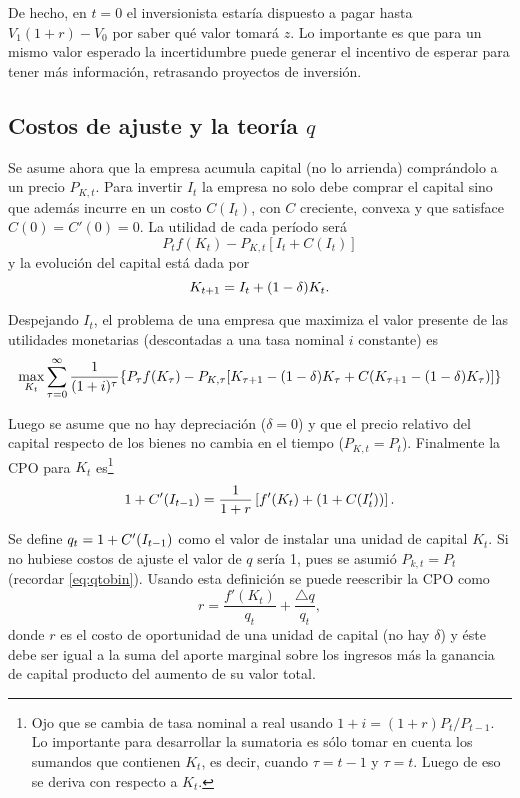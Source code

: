 \documentclass[DeGregorioResumen]{subfiles}
\begin{document}
De hecho, en $t=0$ el inversionista estaría dispuesto a pagar hasta $V_1(1+r)-V_0$ por saber qué valor tomará $z$. Lo importante es que para un mismo valor esperado la incertidumbre puede generar el incentivo de esperar para tener más información, retrasando proyectos de inversión.

\subsection{Costos de ajuste y la teoría $q$}

Se asume ahora que la empresa acumula capital (no lo arrienda) comprándolo a un precio $P_{K,t}$. Para invertir $I_t$ la empresa no solo debe comprar el capital sino que además incurre en un costo $C(I_t)$, con $C$ creciente, convexa y que satisface $C(0)=C'(0)=0$. La utilidad de cada período será
\begin{equation*}
P_t f(K_t)-P_{K,t}[I_t+C(I_t)]
\end{equation*}
y la evolución del capital está dada por
\begin{equation*}
{K}_{t+1}=I_t+(1-\delta)K_t.
\end{equation*}

Despejando $I_t$, el problema de una empresa que maximiza el valor presente de las utilidades monetarias (descontadas a una tasa nominal $i$ constante) es
\begin{equation*}
\max_{K_t}\sum_{\tau=0}^{\infty}{\frac{1}{(1+i)^\tau} \{P_\tau f(K_\tau)-P_{K,\tau}[{K}_{\tau+1}-(1-\delta)K_\tau + C({K}_{\tau+1}-(1-\delta)K_\tau)]\}}
\end{equation*}

Luego se asume que no hay depreciación ($\delta=0$) y que el precio relativo del capital respecto de los bienes no cambia en el tiempo ($P_{K,t}=P_t$). Finalmente la CPO para $K_t$ es\footnote{Ojo que se cambia de tasa nominal a real usando $1+i=(1+r)P_t/P_{t-1}$. Lo importante para desarrollar la sumatoria es sólo tomar en cuenta los sumandos que contienen $K_t$, es decir, cuando $\tau=t-1$ y $\tau=t$. Luego de eso se deriva con respecto a $K_t$.}
\begin{equation}
1+C'({I}_{t-1})=\frac{1}{1+r} \left[f'(K_t)+(1+C(I'_t))\right].
\end{equation}

Se define $q_t=1+C'({I}_{t-1})$ como el valor de instalar una unidad de capital $K_t$. Si no hubiese costos de ajuste el valor de $q$ sería 1, pues se asumió $P_{k,t}=P_t$ (recordar \eqref{eq:qtobin}). Usando esta definición se puede reescribir la CPO como
\begin{equation*}
r=\frac{f'(K_t)}{q_t} + \frac{\bigtriangleup q}{q_t},
\end{equation*}
donde $r$ es el costo de oportunidad de una unidad de capital (no hay $\delta$) y éste debe ser igual a la suma del aporte marginal sobre los ingresos más la ganancia de capital producto del aumento de su valor total.
\end{document}
